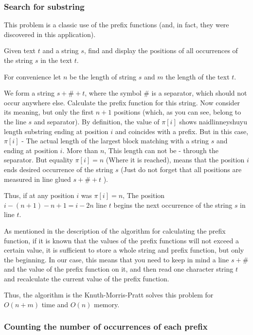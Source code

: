 \subsubsection{ Search for substring }

This problem is a classic use of the prefix functions (and, in fact, they were discovered in this application).

Given text $t$ and a string $s$, find and display the positions of all occurrences of the string $s$ in the text $t$.

For convenience let $n$ be the length of string $s$ and $m$ the length of the text $t$.

We form a string $s + \# + t$, where the symbol $\#$ is a separator, which should not occur anywhere else. Calculate the prefix function for this string. Now consider its meaning, but only the first $n +1$ positions (which, as you can see, belong to the line $s$ and separator). By definition, the value of $\pi [i]$ shows naidlinneyshuyu length substring ending at position $i$ and coincides with a prefix. But in this case, $\pi [i]$ - The actual length of the largest block matching with a string $s$ and ending at position $i$. More than $n$, This length can not be - through the separator. But equality $\pi [i] = n$ (Where it is reached), means that the position $i$ ends desired occurrence of the string $s$ (Just do not forget that all positions are measured in line glued $s + \# + t$ ).

Thus, if at any position $i$ was $\pi [i] = n$, The position $i - (n + 1) - n + 1 = i - 2 n$ line $t$ begins the next occurrence of the string $s$ in line $t$.

As mentioned in the description of the algorithm for calculating the prefix function, if it is known that the values ​​of the prefix functions will not exceed a certain value, it is sufficient to store a whole string and prefix function, but only the beginning. In our case, this means that you need to keep in mind a line $s + \#$ and the value of the prefix function on it, and then read one character string $t$ and recalculate the current value of the prefix function.

Thus, the algorithm is the Knuth-Morris-Pratt solves this problem for $O (n + m)$ time and $O (n)$ memory.

\subsubsection{ Counting the number of occurrences of each prefix }

